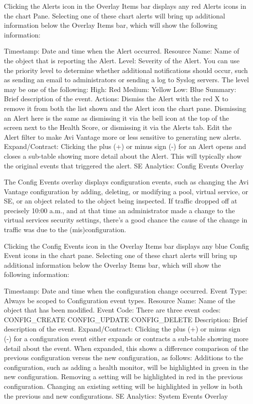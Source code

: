 \documentclass[letterpaper,10pt,english]{sphinxmanual}
\begin{document}
Clicking the Alerts icon in the Overlay Items bar displays any red Alerts icons in the chart Pane. Selecting one of these chart alerts will bring up additional information below the Overlay Items bar, which will show the following information:

Timestamp: Date and time when the Alert occurred.
Resource Name: Name of the object that is reporting the Alert.
Level: Severity of the Alert. You can use the priority level to determine whether additional notifications should occur, such as sending an email to administrators or sending a log to Syslog servers. The level may be one of the following:
High: Red
Medium: Yellow
Low: Blue
Summary: Brief description of the event.
Actions:
Dismiss the Alert with the red X to remove it from both the list shown and the Alert icon the chart pane. Dismissing an Alert here is the same as dismissing it via the bell icon at the top of the screen next to the Health Score, or dismissing it via the Alerts tab.
Edit the Alert filter to make Avi Vantage more or less sensitive to generating new alerts.
Expand/Contract: Clicking the plus (+) or minus sign (-) for an Alert opens and closes a sub-table showing more detail about the Alert. This will typically show the original events that triggered the alert.
SE Analytics: Config Events Overlay

The Config Events overlay displays configuration events, such as changing the Avi Vantage configuration by adding, deleting, or modifying a pool, virtual service, or SE, or an object related to the object being inspected. If traffic dropped off at precisely 10:00 a.m., and at that time an administrator made a change to the virtual services security settings, there's a good chance the cause of the change in traffic was due to the (mis)configuration.

Clicking the Config Events icon in the Overlay Items bar displays any blue Config Event icons in the chart pane. Selecting one of these chart alerts will bring up additional information below the Overlay Items bar, which will show the following information:

Timestamp: Date and time when the configuration change occurred.
Event Type: Always be scoped to Configuration event types.
Resource Name: Name of the object that has been modified.
Event Code: There are three event codes:
CONFIG\_CREATE
CONFIG\_UPDATE
CONFIG\_DELETE
Description: Brief description of the event.
Expand/Contract: Clicking the plus (+) or minus sign (-) for a configuration event either expands or contracts a sub-table showing more detail about the event. When expanded, this shows a difference comparison of the previous configuration versus the new configuration, as follows:
Additions to the configuration, such as adding a health monitor, will be highlighted in green in the new configuration.
Removing a setting will be highlighted in red in the previous configuration.
Changing an existing setting will be highlighted in yellow in both the previous and new configurations.
SE Analytics: System Events Overlay
\end{document}
